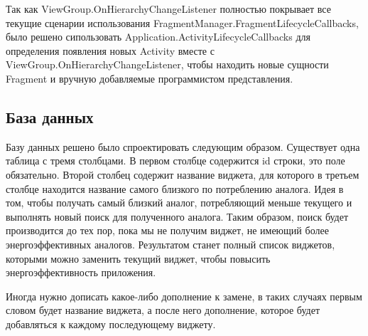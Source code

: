 \documentclass[a4paper,14pt]{extarticle} %
\begin{document}
	Так как ViewGroup.OnHierarchyChangeListener полностью покрывает все текущие сценарии использования FragmentManager.FragmentLifecycleCallbacks, было решено сипользовать Application.ActivityLifecycleCallbacks для определения появления новых Activity вместе с ViewGroup.OnHierarchyChangeListener, чтобы находить новые сущности Fragment и вручную добавляемые программистом представления.
	
	\subsection{База данных}
	
	Базу данных решено было спроектировать следующим образом. Существует одна таблица с тремя столбцами. В первом столбце содержится id строки, это поле обязательно. Второй столбец содержит название виджета, для которого в третьем столбце находится название самого близкого по потреблению аналога. Идея в том, чтобы получать самый близкий аналог, потребляющий меньше текущего и выполнять новый поиск для полученного аналога. Таким образом, поиск будет производится до тех пор, пока мы не получим виджет, не имеющий более энергоэффективных аналогов. Результатом станет полный список виджетов, которыми можно заменить текущий виджет, чтобы повысить энергоэффективность приложения.
	
	Иногда нужно дописать какое-либо дополнение к замене, в таких случаях первым словом будет название виджета, а после него дополнение, которое будет добавляться к каждому последующему виджету.
	
\end{document}

